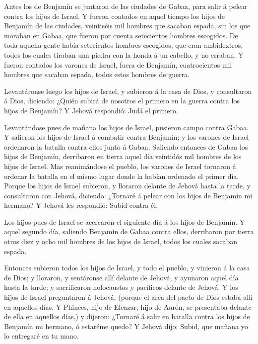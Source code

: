  Antes los de Benjamín se juntaron de las ciudades de
Gabaa, para salir á pelear contra los hijos de Israel.  Y
fueron contados en aquel tiempo los hijos de Benjamín de las ciudades,
veintiséis mil hombres que sacaban espada, sin los que moraban en Gabaa,
que fueron por cuenta setecientos hombres escogidos.  De
toda aquella gente había setecientos hombres escogidos, que eran
ambidextros, todos los cuales tiraban una piedra con la honda á un
cabello, y no erraban.  Y fueron contados los varones de
Israel, fuera de Benjamín, cuatrocientos mil hombres que sacaban espada,
todos estos hombres de guerra.

 Levantáronse luego los hijos de Israel, y subieron á la
casa de Dios, y consultaron á Dios, diciendo: ¿Quién subirá de nosotros
el primero en la guerra contra los hijos de Benjamín? Y Jehová
respondió: Judá el primero.

 Levantándose pues de mañana los hijos de Israel, pusieron
campo contra Gabaa.  Y salieron los hijos de Israel á
combatir contra Benjamín; y los varones de Israel ordenaron la batalla
contra ellos junto á Gabaa.  Saliendo entonces de Gabaa los
hijos de Benjamín, derribaron en tierra aquel día veintidós mil hombres
de los hijos de Israel.  Mas reanimándose el pueblo, los
varones de Israel tornaron á ordenar la batalla en el mismo lugar donde
la habían ordenado el primer día.  Porque los hijos de
Israel subieron, y lloraron delante de Jehová hasta la tarde, y
consultaron con Jehová, diciendo: ¿Tornaré á pelear con los hijos de
Benjamín mi hermano? Y Jehová les respondió: Subid contra él.

 Los hijos pues de Israel se acercaron el siguiente día á
los hijos de Benjamín.  Y aquel segundo día, saliendo
Benjamín de Gabaa contra ellos, derribaron por tierra otros diez y ocho
mil hombres de los hijos de Israel, todos los cuales sacaban espada.

 Entonces subieron todos los hijos de Israel, y todo el
pueblo, y vinieron á la casa de Dios; y lloraron, y sentáronse allí
delante de Jehová, y ayunaron aquel día hasta la tarde; y sacrificaron
holocaustos y pacíficos delante de Jehová.  Y los hijos de
Israel preguntaron á Jehová, (porque el arca del pacto de Dios estaba
allí en aquellos días,  Y Phinees, hijo de Eleazar, hijo de
Aarón, se presentaba delante de ella en aquellos días,) y dijeron:
¿Tornaré á salir en batalla contra los hijos de Benjamín mi hermano, ó
estaréme quedo? Y Jehová dijo: Subid, que mañana yo lo entregaré en tu
mano.

